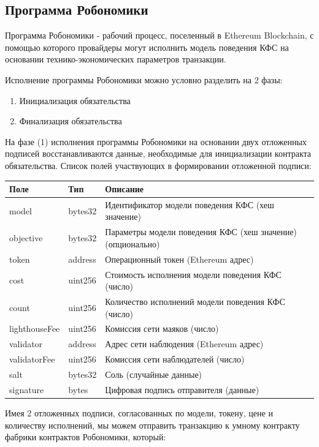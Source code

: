 \documentclass{article}
\begin{document}
\subsection{Программа Робономики}

Программа Робономики - рабочий процесс, поселенный в Ethereum Blockchain, с помощью которого провайдеры могут исполнить модель поведения КФС на основании технико-экономических параметров транзакции.

Исполнение программы Робономики можно условно разделить на 2 фазы:

\begin{enumerate}
	\item Инициализация обязательства
	\item Финализация  обязательства
\end{enumerate}

На фазе (1) исполнения программы Робономики на основании двух отложенных подписей восстанавливаются данные, необходимые для инициализации контракта обязательства. Список полей участвующих в формировании отложенной подписи:
\newline
\newline

\begin{tabular}{ |l |l |l }
 \textbf{Поле} & \textbf{Тип} & \textbf{Описание} \\ 
 \hline
 model & bytes32 & Идентификатор модели поведения КФС (хеш значение) \\  
 objective & bytes32 & Параметры модели поведения КФС (хеш значение) (опционально) \\
 token & address & Операционный токен (Ethereum адрес) \\
 cost & uint256 & Стоимость исполнения модели поведения КФС (число) \\
 count & uint256 & Количество исполнений модели поведения КФС (число) \\
 lighthouseFee & uint256 & Комиссия сети маяков (число) \\
 validator & address & Адрес сети наблюдения (Ethereum адрес) \\
 validatorFee & uint256 & Комиссия сети наблюдателей (число) \\
 salt & bytes32 & Соль (случайные данные) \\
 signature & bytes & Цифровая подпись отправителя (данные) \\
\end{tabular}

Имея 2 отложенных подписи, согласованных по модели, токену, цене и количеству исполнений, мы можем отправить транзакцию к умному контракту фабрики контрактов Робономики, который:
\end{document}
